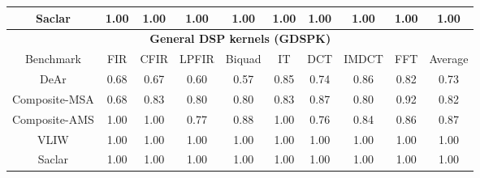 {\begin{table}[!ht]
{\begin{tabular}{|c|c|c|c|c|c|c|c|c|c|}
                Saclar  &   1.00  &   1.00  &   1.00  &   1.00  &   1.00  &   1.00  &   1.00  &   1.00  &   1.00     \\ \hline 
                \multicolumn{10}{|c|}{\textbf{General DSP kernels (GDSPK)}}                     \\ \hline
                Benchmark  &  FIR  &  CFIR  &  LPFIR  &  Biquad  &  IT  &  DCT  &  IMDCT  &  FFT  &  Average \\ \hline 
                DeAr  &   0.68  &   0.67  &  0.60  &   0.57  &   0.85  &   0.74  &   0.86  &   0.82  &   0.73     \\ \hline 
                Composite-MSA  &   0.68  &   0.83  &   0.80  &   0.80  &   0.83  &   0.87  &   0.80  &   0.92  &   0.82     \\ \hline 
                Composite-AMS  &   1.00  &   1.00  &   0.77  &   0.88  &   1.00  &   0.76  &   0.84  &   0.86  &   0.87     \\ \hline 
                VLIW  &   1.00  &   1.00  &   1.00  &   1.00  &   1.00  &   1.00  &   1.00  &   1.00  &   1.00     \\ \hline 
                Saclar  &   1.00  &   1.00  &   1.00  &   1.00  &   1.00  &   1.00  &   1.00  &   1.00  &   1.00     \\ \hline 
            \end{tabular}
        }
    \end{table}
}
